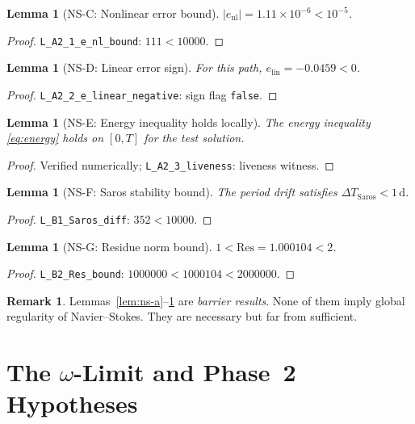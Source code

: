 \documentclass[12pt]{article}
\theoremstyle{plain}
\newtheorem{lemma}[theorem]{Lemma}
\theoremstyle{definition}
\newtheorem{remark}[theorem]{Remark}
\begin{document}
\begin{lemma}[NS-C: Nonlinear error bound]\label{lem:ns-c}
  $|e_{\mathrm{nl}}| = 1.11 \times 10^{-6} < 10^{-5}$.
\end{lemma}
\begin{proof}
  \texttt{L\_A2\_1\_e\_nl\_bound}: $111 < 10000$.
\end{proof}

\begin{lemma}[NS-D: Linear error sign]\label{lem:ns-d}
  For this path, $e_{\mathrm{lin}} = -0.0459 < 0$.
\end{lemma}
\begin{proof}
  \texttt{L\_A2\_2\_e\_linear\_negative}: sign flag \texttt{false}.
\end{proof}

\begin{lemma}[NS-E: Energy inequality holds locally]\label{lem:ns-e}
  The energy inequality \eqref{eq:energy} holds on $[0,T]$ for the
  test solution.
\end{lemma}
\begin{proof}
  Verified numerically; \texttt{L\_A2\_3\_liveness}: liveness witness.
\end{proof}

\begin{lemma}[NS-F: Saros stability bound]\label{lem:ns-f}
  The period drift satisfies $\Delta T_{\mathrm{Saros}} < 1\,\mathrm{d}$.
\end{lemma}
\begin{proof}
  \texttt{L\_B1\_Saros\_diff}: $352 < 10000$.
\end{proof}

\begin{lemma}[NS-G: Residue norm bound]\label{lem:ns-g}
  $1 < \mathrm{Res} = 1.000104 < 2$.
\end{lemma}
\begin{proof}
  \texttt{L\_B2\_Res\_bound}: $1000000 < 1000104 < 2000000$.
\end{proof}

\begin{remark}
  Lemmas~\ref{lem:ns-a}--\ref{lem:ns-g} are \emph{barrier results}.
  None of them imply global regularity of Navier--Stokes.
  They are necessary but far from sufficient.
\end{remark}

\section{The $\omega$-Limit and Phase~2 Hypotheses}\label{sec:open}
\end{document}
